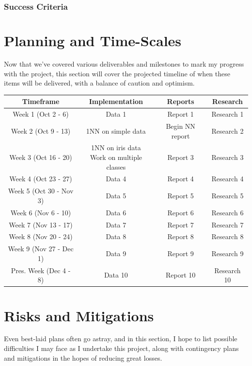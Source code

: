 \documentclass[report,10pt]{article}
\begin{document}
\subsubsection{Success Criteria}
\pagebreak
\section{Planning and Time-Scales}
Now that we've covered various deliverables and milestones to mark my progress with the project, this section will cover the projected timeline of when these items will be delivered, with a balance of caution and optimism. \par
\vspace{10mm}
\begin{tabular}{|c|c|c|c|}
\hline
Timeframe & Implementation & Reports & Research \\
\hline
Week 1 (Oct 2 - 6) & Data 1 & Report 1 & Research 1 \\
Week 2 (Oct 9 - 13) & 1NN on simple data & Begin NN report & Research 2 \\
Week 3 (Oct 16 - 20) & \makecell{1NN on iris data \\ Work on multiple classes} & Report 3 & Research 3 \\
Week 4 (Oct 23 - 27) & Data 4 & Report 4 & Research 4 \\
Week 5 (Oct 30 - Nov 3) & Data 5 & Report 5 & Research 5 \\
Week 6 (Nov 6 - 10) & Data 6 & Report 6 & Research 6 \\
Week 7 (Nov 13 - 17) & Data 7 & Report 7 & Research 7 \\
Week 8 (Nov 20 - 24) & Data 8 & Report 8 & Research 8 \\
Week 9 (Nov 27 - Dec 1) & Data 9 & Report 9 & Research 9 \\
Pres. Week (Dec 4 - 8) & Data 10 & Report 10 & Research 10 \\
\hline
\end{tabular}


\pagebreak
\section{Risks and Mitigations}
Even best-laid plans often go astray, and in this section, I hope to list possible difficulties I may face as I undertake this project, along with contingency plans and mitigations in the hopes of reducing great losses.
\end{document}
